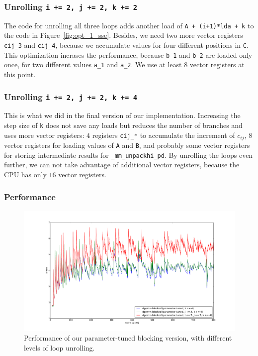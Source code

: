 \documentclass[12pt]{article}
\begin{document}
\subsubsection{Unrolling \lstinline{i += 2, j += 2, k += 2}}
The code for unrolling all three loops adds another load of \lstinline{A + (i+1)*lda + k} to the code in Figure~\ref{fig:opt_1_sse}. Besides, we need two more vector registers \lstinline{cij_3} and \lstinline{cij_4}, because we accumulate values for four different positions in \lstinline{C}. This optimization incrases the performance, because \lstinline{b_1} and \lstinline{b_2} are loaded only once, for two different values \lstinline{a_1} and \lstinline{a_2}. We use at least $8$ vector registers at this point.

\subsubsection{Unrolling \lstinline{i += 2, j += 2, k += 4}}
This is what we did in the final version of our implementation. Increasing the step size of \lstinline{k} does not save any loads but reduces the number of branches and uses more vector registers: $4$ registers \lstinline{cij_*} to accumulate the increment of $c_{ij}$, $8$ vector registers for loading values of \lstinline{A} and \lstinline{B}, and probably some vector registers for storing intermediate results for \lstinline{_mm_unpackhi_pd}. By unrolling the loops even further, we can not take advantage of additional vector registers, because the CPU has only $16$ vector registers.

\subsubsection{Performance}
\begin{figure}
	\includegraphics[width=\textwidth]{graphs/profiles/PROFILE_UNROLLING_SSE.pdf}
	\caption{Performance of our parameter-tuned blocking version, with different levels of loop unrolling.}
	\label{fig:sse_opt_graph}
\end{figure}
\end{document}
